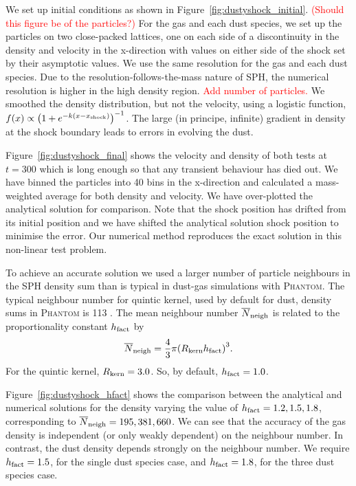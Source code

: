 \documentclass[fleqn,usenatbib]{mnras}
\begin{document}
We set up initial conditions as shown in Figure~\ref{fig:dustyshock_initial}.
\textcolor{red}{(Should this figure be of the particles?)} For the gas and each
dust species, we set up the particles on two close-packed lattices, one on each
side of a discontinuity in the density and velocity in the x-direction with
values on either side of the shock set by their asymptotic values. We use the
same resolution for the gas and each dust species. Due to the
resolution-follows-the-mass nature of SPH, the numerical resolution is higher in
the high density region. \textcolor{red}{Add number of particles.} We smoothed
the density distribution, but not the velocity, using a logistic function,
\(f(x) \propto {\left(1 + e^{-k(x-x_{\rm shock})} \right)}^{-1}\). The large (in
principe, infinite) gradient in density at the shock boundary leads to errors in
evolving the dust.

Figure~\ref{fig:dustyshock_final} shows the velocity and density of both tests
at \(t = 300\) which is long enough so that any transient behaviour has died
out. We have binned the particles into 40 bins in the x-direction and calculated
a mass-weighted average for both density and velocity. We have over-plotted the
analytical solution for comparison. Note that the shock position has drifted
from its initial position and we have shifted the analytical solution shock
position to minimise the error. Our numerical method reproduces the exact
solution in this non-linear test problem.

To achieve an accurate solution we used a larger number of particle neighbours
in the SPH density sum than is typical in dust-gas simulations with
\textsc{Phantom}. The typical neighbour number for quintic kernel, used by
default for dust, density sums in \textsc{Phantom} is 113
\citep{Price2018PASA...35...31P}. The mean neighbour number \(\overline{N}_{\rm
neigh}\) is related to the proportionality constant \(h_{\rm fact}\) by
%
\begin{align}
   \overline{N}_{\rm neigh} = \frac{4}{3} \pi
   {\left( R_{\rm kern} h_{\rm fact} \right)}^3.
\end{align}
%
For the quintic kernel, \( R_{\rm kern} = 3.0 \). So, by default, \( h_{\rm
fact} = 1.0 \).

Figure~\ref{fig:dustyshock_hfact} shows the comparison between the analytical
and numerical solutions for the density varying the value of \( h_{\rm fact} =
1.2, 1.5, 1.8 \), corresponding to \(\overline{N}_{\rm neigh} = 195, 381, 660\).
We can see that the accuracy of the gas density is independent (or only weakly
dependent) on the neighbour number. In contrast, the dust density depends
strongly on the neighbour number. We require \( h_{\rm fact} = 1.5\), for the
single dust species case, and \(h_{\rm fact} = 1.8\), for the three dust species
case.
\end{document}
